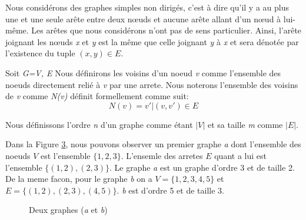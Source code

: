 \documentclass[12pt,a4paper]{article}
\begin{document}
Nous considérons des graphes simples non dirigés, c'est à dire qu'il y a au plus une et une seule arête entre deux nœuds et aucune arête allant d'un nœud à lui-même. Les arêtes que nous considérons n'ont pas de sens particulier. Ainsi, l'arête joignant les nœuds \emph{x} et \emph{y} est la même que celle joignant \emph{y} à \emph{x} et sera dénotée par l'existence du tuple $(x, y) \in E$.

Soit \emph{G=V, E} Nous définirons les voisins d'un noeud \emph{v} comme l'ensemble des noeuds directement relié à \emph{v} par une arrete. Nous noterons l'ensemble des voisins de \emph{v} comme \emph{N(v)} définit formellement comme suit:
\begin{equation}
N(v) = { v' | (v, v') \in E }
\end{equation}

Nous définissons l'ordre \emph{n} d'un graphe comme étant $ |V| $ et sa taille \emph{m} comme $ |E| $.

Dans la Figure \ref{fig:x exemple1}, nous pouvons observer un premier graphe \textit{a} dont l'ensemble des noeuds \(V\) est l'ensemble \(\{1, 2, 3\}\). L'ensemle des arretes \(E\) quant a lui est l'ensemble \(\{(1,2), (2,3)\}\). Le graphe \textit{a} est un graphe d'ordre 3 et de taille 2. De la meme facon, pour le graphe \textit{b} on a \(V = \{1, 2, 3, 4, 5\}\) et \(E = \{(1,2), (2,3), (4,5)\}\). \textit{b} est d'ordre 5 et de taille 3.

\begin{figure}[h]
  \begin{subfigure}[b]{0.50\textwidth}
    \centering
        \caption{}
        \label{fig:x g1}
  \end{subfigure}
  \begin{subfigure}[b]{0.50\textwidth}
    \centering
        \caption{}
        \label{fig:x g2}
  \end{subfigure}
  \caption{Deux graphes (\textit{a} et \textit{b})}
  \label{fig:x exemple1}
\end{figure}
\end{document}
